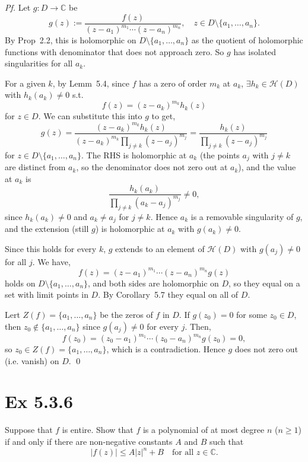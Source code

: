 \documentclass[a4paper]{article}
\newcommand{\C}{\mathbb{C}}
\newcommand{\Hol}{\mathcal{H}}
\begin{document}
\textit{Pf.} Let $g : D \to \C$ be
\[
g(z) := \frac{f(z)}{(z-a_1)^{m_1} \cdots (z-a_n)^{m_n}}, \quad z \in D \setminus \{a_1, \dots, a_n\}.
\]
By Prop~2.2, this is holomorphic on $D \setminus \{a_1, \dots, a_n\}$ as the quotient of holomorphic
functions with denominator that does not approach zero. So $g$ has isolated
singularities for all $a_k$.

For a given $k$, by Lemm~5.4, since $f$ has a zero of order $m_k$ at $a_k$,
$\exists h_k \in \Hol(D)$ with $h_k(a_k) \neq 0$ s.t.
\[
f(z) = (z - a_k)^{m_k} h_k(z)
\]
for $z \in D$. We can substitute this into $g$ to get,
\[
g(z) = \frac{(z-a_k)^{m_k} h_k(z)}{(z-a_k)^{m_k} \prod_{j \neq k} (z-a_j)^{m_j}}
     = \frac{h_k(z)}{\prod_{j \neq k}(z - a_j)^{m_j}}
\]
for $z \in D \setminus \{a_1, \dots, a_n\}$. The RHS is holomorphic at $a_k$ (the points $a_j$ with $j \neq k$ are
distinct from $a_k$, so the denominator does not zero out at $a_k$), and the value at
$a_k$ is
\[
\frac{h_k(a_k)}{\prod_{j \neq k}(a_k - a_j)^{m_j}} \neq 0,
\]
since $h_k(a_k) \neq 0$ and $a_k \neq a_j$ for $j \neq k$. Hence $a_k$ is a removable
singularity of $g$, and the extension (still $g$) is holomorphic at $a_k$ with
$g(a_k) \neq 0$.

Since this holds for every $k$, $g$ extends to an element of $\Hol(D)$ with
$g(a_j) \neq 0$ for all $j$. We have,
\[
f(z) = (z - a_1)^{m_1} \cdots (z - a_n)^{m_n} g(z)
\]
holds on $D \setminus \{a_1, \dots, a_n\}$, and both sides are holomorphic on $D$, so
they equal on a set with limit points in $D$. By Corollary~5.7
they equal on all of $D$.

\medskip
Lert $Z(f) = \{a_1, \dots, a_n\}$ be the zeros of $f$ in $D$. If $g(z_0) = 0$
for some $z_0 \in D$, then $z_0 \notin \{a_1, \dots, a_n\}$ since $g(a_j) \neq 0$ for
every $j$. Then,
\[
f(z_0) = (z_0 - a_1)^{m_1} \cdots (z_0 - a_n)^{m_n} g(z_0) = 0,
\]
so $z_0 \in Z(f) = \{a_1, \dots, a_n\}$, which is a contradiction. Hence $g$ does not zero out (i.e. vanish) on
$D$. \qed

\newpage
\section*{Ex 5.3.6}

\begin{tcolorbox}[colback=gray!10, colframe=black, boxrule=0.5pt, arc=2mm]
Suppose that $f$ is entire. Show that $f$ is a polynomial of at most degree $n$
($n \geq 1$) if and only if there are non-negative constants $A$ and $B$ such that
\[
|f(z)| \leq A|z|^n + B \quad \text{for all } z \in \C.
\]
\end{tcolorbox}
\end{document}
